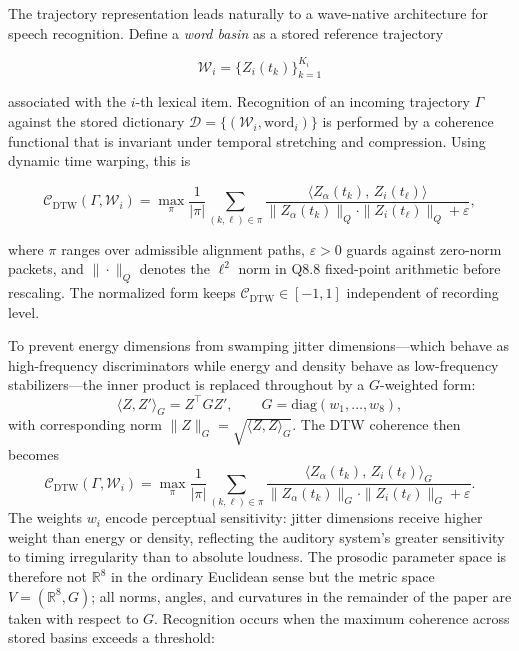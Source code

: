 \documentclass[12pt, a4paper]{article}
\begin{document}
The trajectory representation leads naturally to a wave-native architecture for speech recognition. Define a \emph{word basin} as a stored reference trajectory

\begin{equation}
\mathcal{W}_i = \{Z_i(t_k)\}_{k=1}^{K_i}
\label{eq:basin}
\end{equation}

associated with the $i$-th lexical item. Recognition of an incoming trajectory $\Gamma$ against the stored dictionary $\mathcal{D} = \{(\mathcal{W}_i, \mathrm{word}_i)\}$ is performed by a coherence functional that is invariant under temporal stretching and compression. Using dynamic time warping, this is

\begin{equation}
\mathcal{C}_{\mathrm{DTW}}(\Gamma, \mathcal{W}_i)
=
\max_{\pi}
\frac{1}{|\pi|}
\sum_{(k, \ell) \in \pi}
\frac{\langle Z_\alpha(t_k),\, Z_i(t_\ell) \rangle}
{\|Z_\alpha(t_k)\|_{Q} \cdot \|Z_i(t_\ell)\|_{Q} + \varepsilon},
\label{eq:dtw}
\end{equation}

where $\pi$ ranges over admissible alignment paths, $\varepsilon > 0$ guards against zero-norm packets, and $\|\cdot\|_{Q}$ denotes the $\ell^2$ norm in Q8.8 fixed-point arithmetic before rescaling. The normalized form keeps $\mathcal{C}_{\mathrm{DTW}} \in [-1, 1]$ independent of recording level.

To prevent energy dimensions from swamping jitter dimensions---which behave as high-frequency discriminators while energy and density behave as low-frequency stabilizers---the inner product is replaced throughout by a $G$-weighted form:
\begin{equation}
\langle Z, Z' \rangle_G = Z^\top G Z', \qquad G = \mathrm{diag}(w_1, \ldots, w_8),
\label{eq:Gproduct}
\end{equation}
with corresponding norm $\|Z\|_G = \sqrt{\langle Z, Z \rangle_G}$. The DTW coherence then becomes
\begin{equation}
\mathcal{C}_{\mathrm{DTW}}(\Gamma, \mathcal{W}_i)
= \max_{\pi} \frac{1}{|\pi|} \sum_{(k,\ell) \in \pi}
\frac{\langle Z_\alpha(t_k),\, Z_i(t_\ell) \rangle_G}
{\|Z_\alpha(t_k)\|_G \cdot \|Z_i(t_\ell)\|_G + \varepsilon}.
\label{eq:dtwG}
\end{equation}
The weights $w_i$ encode perceptual sensitivity: jitter dimensions receive higher weight than energy or density, reflecting the auditory system's greater sensitivity to timing irregularity than to absolute loudness. The prosodic parameter space is therefore not $\mathbb{R}^8$ in the ordinary Euclidean sense but the metric space $V = (\mathbb{R}^8, G)$; all norms, angles, and curvatures in the remainder of the paper are taken with respect to $G$. Recognition occurs when the maximum coherence across stored basins exceeds a threshold:
\end{document}
